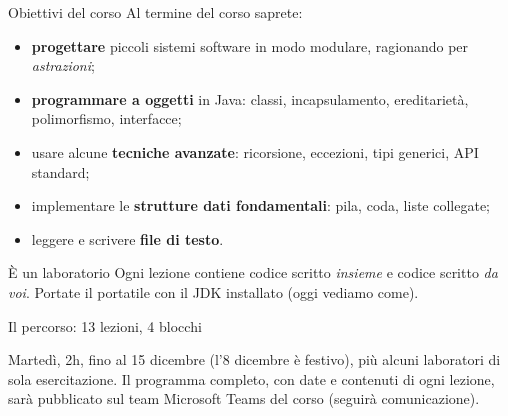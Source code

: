 \documentclass[10pt,aspectratio=169]{beamer}
\begin{document}
\begin{frame}{Obiettivi del corso}
Al termine del corso saprete:
\begin{itemize}
    \item \textbf{progettare} piccoli sistemi software in modo modulare, ragionando per \emph{astrazioni};
    \item \textbf{programmare a oggetti} in Java: classi, incapsulamento, ereditarietà, polimorfismo, interfacce;
    \item usare alcune \textbf{tecniche avanzate}: ricorsione, eccezioni, tipi generici, API standard;
    \item implementare le \textbf{strutture dati fondamentali}: pila, coda, liste collegate;
    \item leggere e scrivere \textbf{file di testo}.
\end{itemize}

\vspace{0.3cm}
\begin{block}{È un laboratorio}
Ogni lezione contiene codice scritto \emph{insieme} e codice scritto \emph{da voi}. Portate il portatile con il JDK installato (oggi vediamo come).
\end{block}
\end{frame}

\begin{frame}[fragile]{Il percorso: 13 lezioni, 4 blocchi}

\vspace{0.2cm}
\small Martedì, 2h, fino al 15 dicembre (l'8 dicembre è festivo), più alcuni laboratori di sola esercitazione. Il programma completo, con date e contenuti di ogni lezione, sarà pubblicato sul team Microsoft Teams del corso (seguirà comunicazione).
\end{frame}
\end{document}
